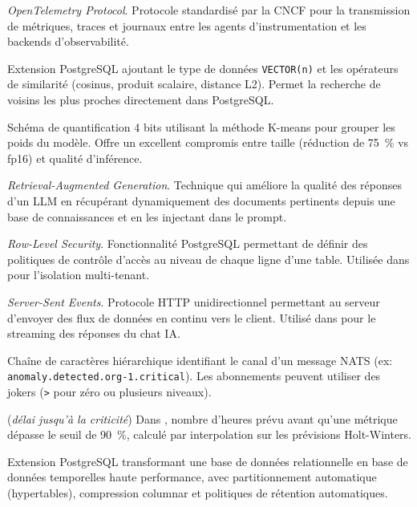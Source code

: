 \begin{description}[leftmargin=3.5cm, style=nextline, font=\bfseries\color{NavyBlue}]
  \item[OTLP]
    \textit{OpenTelemetry Protocol}. Protocole standardisé par la CNCF pour la
    transmission de métriques, traces et journaux entre les agents d'instrumentation
    et les backends d'observabilité.

  \item[pgvector]
    Extension PostgreSQL ajoutant le type de données \texttt{VECTOR(n)} et les
    opérateurs de similarité (cosinus, produit scalaire, distance L2). Permet
    la recherche de voisins les plus proches directement dans PostgreSQL.

  \item[Q4\_K\_M]
    Schéma de quantification 4 bits utilisant la méthode K-means pour grouper
    les poids du modèle. Offre un excellent compromis entre taille (réduction
    de 75~\% vs fp16) et qualité d'inférence.

  \item[RAG]
    \textit{Retrieval-Augmented Generation}. Technique qui améliore la qualité
    des réponses d'un LLM en récupérant dynamiquement des documents pertinents
    depuis une base de connaissances et en les injectant dans le prompt.

  \item[RLS]
    \textit{Row-Level Security}. Fonctionnalité PostgreSQL permettant de définir
    des politiques de contrôle d'accès au niveau de chaque ligne d'une table.
    Utilisée dans \caimp{} pour l'isolation multi-tenant.

  \item[SSE]
    \textit{Server-Sent Events}. Protocole HTTP unidirectionnel permettant
    au serveur d'envoyer des flux de données en continu vers le client.
    Utilisé dans \caimp{} pour le streaming des réponses du chat IA.

  \item[Subject NATS]
    Chaîne de caractères hiérarchique identifiant le canal d'un message NATS
    (ex: \texttt{anomaly.detected.org-1.critical}). Les abonnements peuvent
    utiliser des jokers (\texttt{>} pour zéro ou plusieurs niveaux).

  \item[Time to critical]
    (\textit{délai jusqu'à la criticité}) Dans \caimp{}, nombre d'heures prévu
    avant qu'une métrique dépasse le seuil de 90~\%, calculé par interpolation
    sur les prévisions Holt-Winters.

  \item[TimescaleDB]
    Extension PostgreSQL transformant une base de données relationnelle en base
    de données temporelles haute performance, avec partitionnement automatique
    (hypertables), compression columnar et politiques de rétention automatiques.


\end{description}
